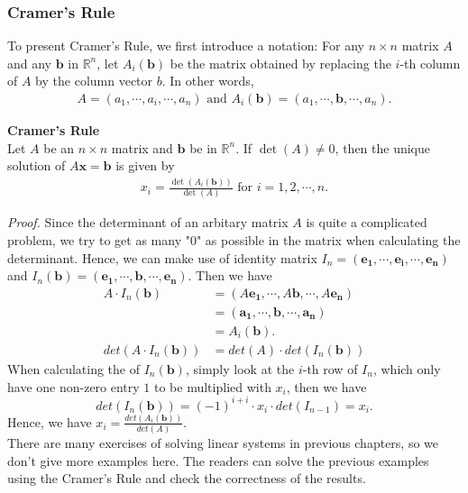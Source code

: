 \documentclass[10pt, a4paper]{article}
\newcommand{\R}{\mathbb{R}}
\begin{document}
\subsubsection*{Cramer's Rule}
\indent To present Cramer's Rule, we first introduce a notation: For any $n\times n$ matrix $A$ and any $\mathbf{b}$ in $\R^n$, let $A_i(\mathbf{b})$ be the matrix obtained by replacing the $i$-th column of $A$ by the column vector $b$. In other words, 
\begin{align*}
    A = (a_1,\cdots,a_i,\cdots,a_n) \text{ and } A_i(\mathbf{b}) = (a_1,\cdots,\mathbf{b},\cdots,a_n).
\end{align*}
\begin{proposition}
    \textbf{Cramer's Rule}\\
    Let $A$ be an $n\times n$ matrix and $\mathbf{b}$ be in $\R^n$. If $\det(A)\neq 0$, then the unique solution of $A\mathbf{x} = \mathbf{b}$ is given by 
    \begin{align*}
        x_i = \frac{\det(A_i(\mathbf{b}))}{\det(A)} \text{ for } i = 1,2,\cdots,n.
    \end{align*}
\end{proposition}
\indent \textit{Proof.} Since the determinant of an arbitary matrix $A$ is quite a complicated problem, we try to get as many "0" as possible in the matrix when calculating the determinant. Hence, we can make use of identity matrix $I_n = (\mathbf{e_1}, \cdots, \mathbf{e_i}, \cdots, \mathbf{e_n})$ and $I_n(\mathbf{b}) = (\mathbf{e_1}, \cdots, \mathbf{b}, \cdots, \mathbf{e_n})$. Then we have
\begin{align*}
    A\cdot I_n(\mathbf{b}) &= (A\mathbf{e_1}, \cdots, A\mathbf{b}, \cdots, A\mathbf{e_n}) \\
    &= (\mathbf{a_1}, \cdots, \mathbf{b}, \cdots, \mathbf{a_n}) \\
    &= A_i(\mathbf{b}).\\
    det(A\cdot I_n(\mathbf{b})) &= det(A)\cdot det(I_n(\mathbf{b})) 
\end{align*}
When calculating the of $I_n(\mathbf{b})$, simply look at the $i$-th row of $I_n$, which only have one non-zero entry $1$ to be multiplied with $x_i$, then we have $$
det(I_n(\mathbf{b})) = (-1)^{i+i} \cdot x_i \cdot det(I_{n-1}) = x_i.
$$
Hence, we have $x_i = \frac{det(A_i(\mathbf{b}))}{det(A)}$.\\
\indent There are many exercises of solving linear systems in previous chapters, so we don't give more examples here. The readers can solve the previous examples using the Cramer's Rule and check the correctness of the results.
\end{document}
